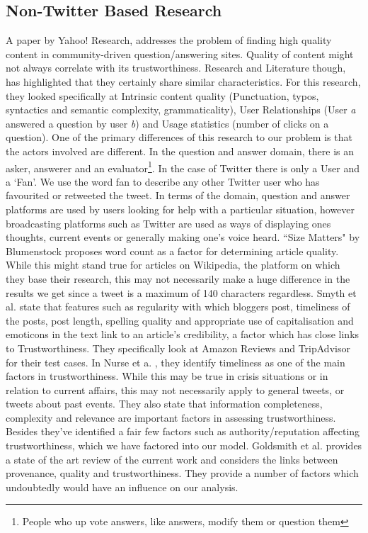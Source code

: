 \subsection{Non-Twitter Based Research} 
A paper by Yahoo! Research\cite{5}, addresses the problem of finding high quality content in community-driven question/answering sites. Quality of content might not always correlate with its trustworthiness. Research and Literature though, has highlighted that they certainly share similar characteristics. For this research, they looked specifically at Intrinsic content quality (Punctuation, typos, syntactics and semantic complexity, grammaticality), User Relationships (User \textit{a} answered a question by user \textit{b}) and Usage statistics (number of clicks on a question). One of the primary differences of this research to our problem is that the actors involved are different. In the question and answer domain, there is an asker, answerer and an evaluator\footnote{People who up vote answers, like answers, modify them or question them}. In the case of Twitter there is only a User and a `Fan'. We use the word fan to describe any other Twitter user who has favourited or retweeted the tweet. In terms of the domain, question and answer platforms are used by users looking for help with a particular situation\cite{5}, however broadcasting platforms such as Twitter are used as ways of displaying ones thoughts, current events or generally making one's voice heard. ``Size Matters" by Blumenstock\cite{4} proposes word count as a factor for determining article quality. While this might stand true for articles on Wikipedia, the platform on which they base their research, this may not necessarily make a huge difference in the results we get since a tweet is a maximum of 140 characters regardless. Smyth et al. \cite{10} state that features such as regularity with which bloggers post, timeliness of the posts, post length, spelling quality and appropriate use of capitalisation and emoticons in the text link to an article's credibility, a factor which has close links to Trustworthiness. They specifically look at Amazon Reviews and TripAdvisor for their test cases.  In Nurse et a. \cite{7}, they identify timeliness as one of the main factors in trustworthiness. While this may be true in crisis situations or in relation to current affairs, this may not necessarily apply to general tweets, or tweets about past events. They also state that information completeness, complexity and relevance are important factors in assessing trustworthiness. Besides they've identified a fair few factors such as authority/reputation affecting trustworthiness, which we have factored into our model. Goldsmith et al.\cite{13} provides a state of the art review of the current work and considers the links between provenance, quality and trustworthiness. They provide a number of factors which undoubtedly would have an influence on our analysis.
